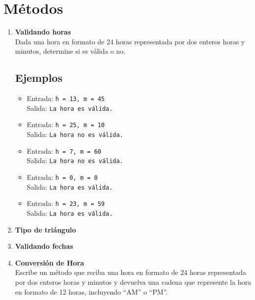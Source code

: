 \section{Métodos}
\begin{enumerate}
    \item \textbf{Validando horas}\\
     Dada una hora en formato de 24 horas representada por dos enteros horas y minutos, determine si es válida o no.
     \subsection*{Ejemplos}
    \begin{itemize}
        \item Entrada: \texttt{h = 13, m = 45}\\
              Salida: \texttt{La hora es válida.}
        \item Entrada: \texttt{h = 25, m = 10}\\
              Salida: \texttt{La hora no es válida.}
        \item Entrada: \texttt{h = 7, m = 60}\\
              Salida: \texttt{La hora no es válida.}
        \item Entrada: \texttt{h = 0, m = 0}\\
              Salida: \texttt{La hora es válida.}
        \item Entrada: \texttt{h = 23, m = 59}\\
              Salida: \texttt{La hora es válida.}
    \end{itemize}

     \item \textbf{Tipo de triángulo}\\
    

    \item \textbf{Validando fechas}\\
    
    
    \item \textbf{Conversión de Hora} \\
    Escribe un método que reciba una hora en formato de 24 horas representada por dos enteros horas y minutos y devuelva una cadena que represente la hora en formato de 12 horas, incluyendo ``AM'' o ``PM''.

\end{enumerate}

